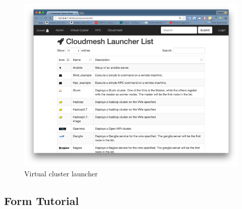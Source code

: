 \begin{figure}[htb] 
  \centering 
    \includegraphics[width=1.0\columnwidth]{images/client/Picture7.png} 
    \caption{Virtual cluster launcher}
    \label{F:7}
\end{figure} 


\subsection{Form Tutorial}


